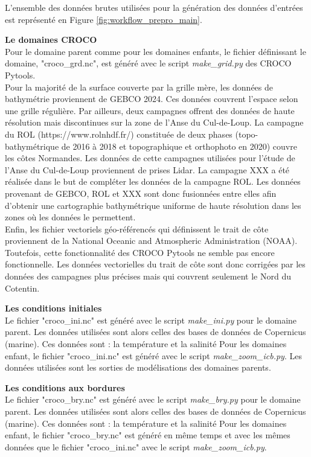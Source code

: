 \documentclass[10pt,a4paper,titlepage]{article}
\begin{document}
L'ensemble des données brutes utilisées pour la génération des données d'entrées est représenté en Figure \ref{fig:workflow_prepro_main}.

\textbf{Le domaines CROCO}\\
Pour le domaine parent comme pour les domaines enfants, le fichier définissant le domaine, "croco\_grd.nc", est généré avec le script \textit{make\_grid.py} des CROCO Pytools.
\\
Pour la majorité de la surface couverte par la grille mère, les données de bathymétrie proviennent de GEBCO 2024.
Ces données couvrent l'espace selon une grille régulière.
Par ailleurs, deux campagnes offrent des données de haute résolution mais discontinues sur la zone de l'Anse du Cul-de-Loup.
La campagne du ROL (https://www.rolnhdf.fr/) constituée de deux phases (topo-bathymétrique de 2016 à 2018 et topographique et orthophoto en 2020) couvre les côtes Normandes.
Les données de cette campagnes utilisées pour l'étude de l'Anse du Cul-de-Loup proviennent de prises Lidar.
La campagne XXX a été réalisée dans le but de compléter les données de la campagne ROL.
Les données provenant de GEBCO, ROL et XXX sont donc fusionnées entre elles afin d'obtenir une cartographie bathymétrique uniforme de haute résolution dans les zones où les données le permettent.
\\
Enfin, les fichier vectoriels géo-référencés qui définissent le trait de côte proviennent de la National Oceanic and Atmospheric Administration (NOAA).
Toutefois, cette fonctionnalité des CROCO Pytools ne semble pas encore fonctionnelle.
Les données vectorielles du trait de côte sont donc corrigées par les données des campagnes plus précises mais qui couvrent seulement le Nord du Cotentin.

\textbf{Les conditions initiales}\\
\label{par:cond_init}
Le fichier "croco\_ini.nc" est généré avec le script \textit{make\_ini.py} pour le domaine parent.
Les données utilisées sont alors celles des bases de données de Copernicus (marine).
Ces données sont : la température et la salinité %
Pour les domaines enfant, le fichier "croco\_ini.nc" est généré avec le script \textit{make\_zoom\_icb.py}.
Les données utilisées sont les sorties de modélisations des domaines parents.

\textbf{Les conditions aux bordures}\\
\label{par:cond_bords}
Le fichier "croco\_bry.nc" est généré avec le script \textit{make\_bry.py} pour le domaine parent.
Les données utilisées sont alors celles des bases de données de Copernicus (marine).
Ces données sont : la température et la salinité %
Pour les domaines enfant, le fichier "croco\_bry.nc" est généré en même temps et avec les mêmes données que le fichier "croco\_ini.nc" avec le script \textit{make\_zoom\_icb.py}.
\end{document}
